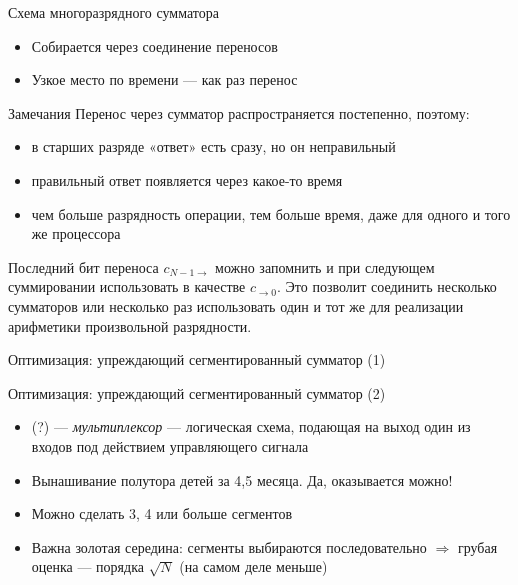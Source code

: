 \documentclass[xetex,aspectratio=43]{beamer}
\begin{document}
\begin{frame}{Схема многоразрядного сумматора}
    \begin{itemize}
        \item
        Собирается через соединение переносов
        \item
        Узкое место по времени --- как раз перенос
    \end{itemize}

    \begin{block}{Замечания}
        Перенос через сумматор распространяется постепенно, поэтому:

        \begin{itemize}
            \tightlist
            \item
            в старших разряде «ответ» есть сразу, но он неправильный
            \item
            правильный ответ появляется через какое-то время
            \item
            чем больше разрядность операции, тем больше время, даже для одного и
            того же процессора
        \end{itemize}

        Последний бит переноса \(c_{N-1 \rightarrow}\) можно запомнить и при
        следующем суммировании использовать в качестве \(c_{\rightarrow 0}\).
        Это позволит соединить несколько сумматоров или несколько раз
        использовать один и тот же для реализации арифметики произвольной
        разрядности.
    \end{block}
\end{frame}

\begin{frame}{Оптимизация: упреждающий сегментированный сумматор (1)}
    
\end{frame}

\begin{frame}{Оптимизация: упреждающий сегментированный сумматор (2)}
    \begin{itemize}
        \item
        (?) --- \emph{мультиплексор} --- логическая схема, подающая на выход один из входов под действием управляющего сигнала
        \item
        Вынашивание полутора детей за 4,5 месяца. Да, оказывается можно!
        \item
        Можно сделать 3, 4 или больше сегментов
        \item
        Важна золотая середина: сегменты выбираются последовательно
        \(\Rightarrow\) грубая оценка --- порядка \(\sqrt{N}\) (на самом деле меньше)
    \end{itemize}
\end{frame}
\end{document}
